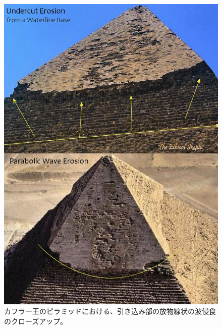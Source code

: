\documentclass[10pt,twocolumn,letterpaper]{article}
\begin{document}
\begin{figure}[H]
\begin{center}
   \includegraphics[width=1\linewidth]{wave.jpg}
\end{center}
   \caption{カフラー王のピラミッドにおける、引き込み部の放物線状の波侵食のクローズアップ\cite{27}。}
\label{fig:19}
\label{fig:onecol}
\end{figure}
\end{document}
